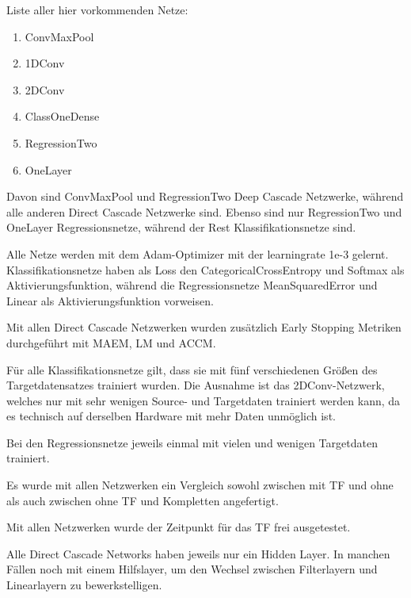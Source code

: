 
Liste aller hier vorkommenden Netze:

\begin{enumerate}
    \item ConvMaxPool
    \item 1DConv
    \item 2DConv
    \item ClassOneDense
    \item RegressionTwo
    \item OneLayer
\end{enumerate}

Davon sind ConvMaxPool und RegressionTwo Deep Cascade Netzwerke, während alle anderen Direct Cascade Netzwerke sind. 
Ebenso sind nur RegressionTwo und OneLayer Regressionsnetze, während der Rest Klassifikationsnetze sind. 

Alle Netze werden mit dem Adam-Optimizer mit der learningrate 1e-3 gelernt. Klassifikationsnetze haben als Loss den 
CategoricalCrossEntropy und Softmax als Aktivierungsfunktion, während die Regressionsnetze MeanSquaredError und Linear als 
Aktivierungsfunktion vorweisen. 

Mit allen Direct Cascade Netzwerken wurden zusätzlich Early Stopping Metriken durchgeführt mit MAEM, LM und ACCM. 

Für alle Klassifikationsnetze gilt, dass sie mit fünf verschiedenen Größen des Targetdatensatzes trainiert wurden. Die Ausnahme ist das 
2DConv-Netzwerk, welches nur mit sehr wenigen Source- und Targetdaten trainiert werden kann, da es technisch auf derselben Hardware mit mehr 
Daten unmöglich ist. 

Bei den Regressionsnetze jeweils einmal mit vielen und wenigen Targetdaten trainiert. 


Es wurde mit allen Netzwerken ein Vergleich sowohl zwischen mit TF und ohne als auch zwischen ohne TF und Kompletten angefertigt. 

Mit allen Netzwerken wurde der Zeitpunkt für das TF frei ausgetestet. 

Alle Direct Cascade Networks haben jeweils nur ein Hidden Layer. In manchen Fällen noch mit einem Hilfslayer, um den Wechsel 
zwischen Filterlayern und Linearlayern zu bewerkstelligen. 

